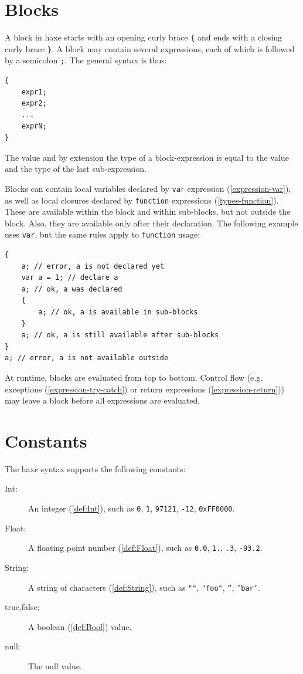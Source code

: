 \documentclass[a4paper,oneside]{book}
\newcommand{\expr}[1]{\texttt{#1}}
\newcommand{\tref}[2]{#1 (\ref{#2})}
\begin{document}
\section{Blocks}
\label{expression-block}

A block in haxe starts with an opening curly brace \expr{\{} and ends with a closing curly brace \expr{\}}. A block may contain several expressions, each of which is followed by a semicolon \expr{;}. The general syntax is thus:

\begin{lstlisting}
{
	expr1;
	expr2;
	...
	exprN;
}
\end{lstlisting}
The value and by extension the type of a block-expression is equal to the value and the type of the last sub-expression.

Blocks can contain local variables declared by \tref{\expr{var} expression}{expression-var}, as well as local closures declared by \tref{\expr{function} expressions}{types-function}. These are available within the block and within sub-blocks, but not outside the block. Also, they are available only after their declaration. The following example uses \expr{var}, but the same rules apply to \expr{function} usage:

\begin{lstlisting}
{
	a; // error, a is not declared yet
	var a = 1; // declare a
	a; // ok, a was declared
	{
		a; // ok, a is available in sub-blocks
	}
	a; // ok, a is still available after sub-blocks
}
a; // error, a is not available outside
\end{lstlisting}
At runtime, blocks are evaluated from top to bottom. Control flow (e.g. \tref{exceptions}{expression-try-catch} or \tref{return expressions}{expression-return}) may leave a block before all expressions 
are evaluated.


\section{Constants}
\label{expression-constants}

The haxe syntax supports the following constants:

\begin{description}
	\item[Int:] An \tref{integer}{def:Int}, such as \expr{0}, \expr{1}, \expr{97121}, \expr{-12}, \expr{0xFF0000}.
	\item[Float:] A \tref{floating point number}{def:Float}, such as \expr{0.0}, \expr{1.}, \expr{.3}, \expr{-93.2}.
	\item[String:] A \tref{string of characters}{def:String}, such as \expr{""}, \expr{"foo"}, \expr{''}, \expr{'bar'}.
	\item[true,false:] A \tref{boolean}{def:Bool} value.
	\item[null:] The null value.
\end{description}
\end{document}
